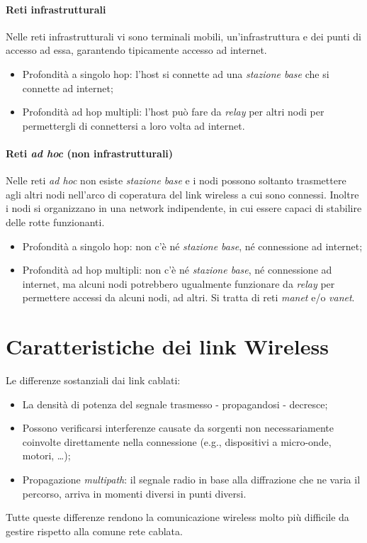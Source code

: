 \paragraph{Reti infrastrutturali}
Nelle reti infrastrutturali vi sono terminali mobili, un'infrastruttura e dei punti di accesso ad essa, garantendo tipicamente accesso ad internet.
\begin{itemize}
	\item Profondità a singolo hop: l'host si connette ad una \textit{stazione base} che si connette ad internet;
	\item Profondità ad hop multipli: l'host può fare da \textit{relay} per altri nodi per permettergli di connettersi a loro volta ad internet.
\end{itemize}

\paragraph{Reti \textit{ad hoc} (non infrastrutturali)}
Nelle reti \textit{ad hoc} non esiste \textit{stazione base} e i nodi possono soltanto trasmettere agli altri nodi nell'arco di coperatura del link wireless a cui sono connessi. Inoltre i nodi si organizzano in una network indipendente, in cui essere capaci di stabilire delle rotte funzionanti.
\begin{itemize}
	\item Profondità a singolo hop: non c'è né \textit{stazione base}, né connessione ad internet;
	\item Profondità ad hop multipli: non c'è né \textit{stazione base}, né connessione ad internet, ma alcuni nodi potrebbero ugualmente funzionare da \textit{relay} per permettere accessi da alcuni nodi, ad altri. Si tratta di reti \textit{manet} e/o \textit{vanet}.
\end{itemize}

\section{Caratteristiche dei link Wireless}
Le differenze sostanziali dai link cablati:
\begin{itemize}
	\item La densità di potenza del segnale trasmesso - propagandosi - decresce;
	\item Possono verificarsi interferenze causate da sorgenti non necessariamente coinvolte direttamente nella connessione (e.g., dispositivi a micro-onde, motori, \ldots);
	\item Propagazione \textit{multipath}: il segnale radio in base alla diffrazione che ne varia il percorso, arriva in momenti diversi in punti diversi.
\end{itemize}
Tutte queste differenze rendono la comunicazione wireless molto più difficile da gestire rispetto alla comune rete cablata.

